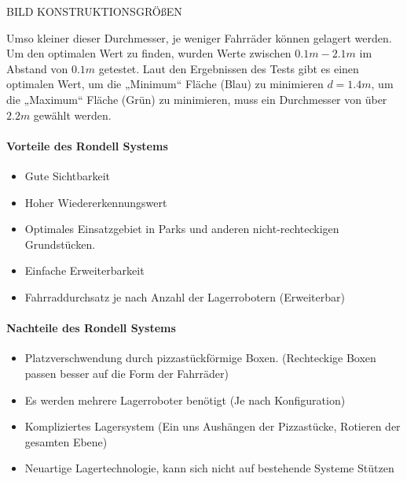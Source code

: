 BILD KONSTRUKTIONSGRÖßEN

Umso kleiner dieser Durchmesser, je weniger Fahrräder können gelagert werden. Um den optimalen Wert zu finden, wurden Werte zwischen $0.1m-2.1m$ im Abstand von $0.1m$ getestet. Laut den Ergebnissen des Tests gibt es einen optimalen Wert, um die „Minimum“ Fläche (Blau) zu minimieren $d=1.4m$, um die „Maximum“ Fläche (Grün) zu minimieren, muss ein Durchmesser von über $2.2m$ gewählt werden.

\paragraph{Vorteile des Rondell Systems}
\begin{itemize}
  \item Gute Sichtbarkeit
  \item Hoher Wiedererkennungswert
  \item Optimales Einsatzgebiet in Parks und anderen nicht-rechteckigen Grundstücken.
  \item Einfache Erweiterbarkeit
  \item Fahrraddurchsatz je nach Anzahl der Lagerrobotern (Erweiterbar)
\end{itemize}

\paragraph{Nachteile des Rondell Systems}
\begin{itemize}
  \item Platzverschwendung durch pizzastückförmige Boxen. (Rechteckige Boxen passen besser auf die Form der Fahrräder)
  \item Es werden mehrere Lagerroboter benötigt (Je nach Konfiguration)
  \item Kompliziertes Lagersystem (Ein uns Aushängen der Pizzastücke, Rotieren der gesamten Ebene)
  \item Neuartige Lagertechnologie, kann sich nicht auf bestehende Systeme Stützen
\end{itemize}
